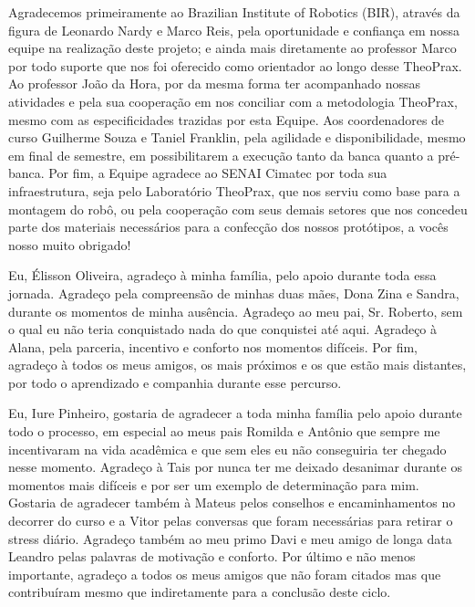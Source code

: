 \begin{agradecimentos}
	Agradecemos primeiramente ao Brazilian Institute of Robotics (BIR), através da figura de Leonardo Nardy e Marco Reis, pela oportunidade e confiança em nossa equipe na realização deste projeto; e ainda mais diretamente ao professor Marco por todo suporte que nos foi oferecido como orientador ao longo desse TheoPrax. Ao professor João da Hora,  por da mesma forma ter acompanhado nossas atividades e pela sua cooperação em nos conciliar com a metodologia TheoPrax, mesmo com as especificidades trazidas por esta Equipe. Aos coordenadores de curso Guilherme Souza e Taniel Franklin, pela agilidade e disponibilidade, mesmo em final de semestre, em possibilitarem a execução tanto da banca quanto a pré-banca. Por fim, a Equipe agradece ao SENAI Cimatec por toda sua infraestrutura, seja pelo Laboratório TheoPrax, que nos serviu como base para a montagem do robô, ou pela cooperação com seus demais setores que nos concedeu parte dos materiais necessários para a confecção dos nossos protótipos, a vocês nosso muito obrigado!
	
	Eu, Élisson Oliveira, agradeço à minha família, pelo apoio durante toda essa jornada. Agradeço pela compreensão de minhas duas mães, Dona Zina e Sandra, durante os momentos de minha ausência. Agradeço ao meu pai, Sr. Roberto, sem o qual eu não teria conquistado nada do que conquistei até aqui. Agradeço à Alana, pela parceria, incentivo e conforto nos momentos difíceis. Por fim, agradeço à todos os meus amigos, os mais próximos e os que estão mais distantes, por todo o aprendizado e companhia durante esse percurso.
	
	Eu, Iure Pinheiro, gostaria de agradecer a toda minha família pelo apoio durante todo o processo, em especial ao meus pais Romilda e Antônio que sempre me incentivaram na vida acadêmica e que sem eles eu não conseguiria ter chegado nesse momento. Agradeço à Tais por nunca ter me deixado desanimar durante os momentos mais difíceis e por ser um exemplo de determinação para mim. Gostaria de agradecer também à Mateus pelos conselhos e encaminhamentos no decorrer do curso e a Vitor pelas conversas que foram  necessárias para retirar o stress diário. Agradeço também ao meu primo Davi e meu amigo de longa data Leandro pelas palavras de motivação e conforto. Por último e não menos importante, agradeço a todos os meus amigos que não foram citados mas que contribuíram mesmo que indiretamente para a conclusão deste ciclo.
	

\end{agradecimentos}
